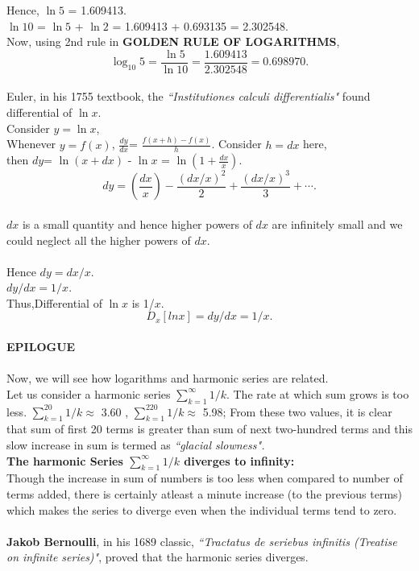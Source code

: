 \documentclass[a4paper,11pt]{article}
\begin{document}
Hence,  $\ln5$ = 1.609413.\\
$\ln10$ = $\ln 5$ + $\ln 2$ = 1.609413 + 0.693135 = 2.302548.\\
Now, using 2nd rule in \textbf{GOLDEN RULE OF LOGARITHMS},\\
$$ \log_{10}5 = \frac{\ln5}{\ln10} = \frac{1.609413}{2.302548} = 0.698970.$$ \\
Euler, in his 1755 textbook, the \textit{``Institutiones calculi differentialis"} found
 differential of $\ln x$. \\
Consider $y = \ln x$, \\
Whenever $y=f(x)$, $\frac{dy}{dx}$= $\frac{f(x+h)-f(x)}{h}$. Consider $h=dx$ here,\\
then $dy$= $\ln(x + dx)$ - $\ln x$ = $\ln( 1 + \frac{dx}{x})$.\\
$$ dy= \left(\frac{dx}{x}\right) - \frac{(dx/x)^2}{2} +  \frac{(dx/x)^3}{3} + \cdots. $$\\
$dx$ is a small quantity and hence higher powers of $dx$ are infinitely small and we could neglect all the higher powers of $dx$.\\
\\
Hence $dy = dx/x$.\\
$dy/dx = 1/x$.\\
Thus,Differential of $\ln x$ is 1/$x$.\\
$$D_{x}{[ln x]} = dy/dx = 1/x. $$
\\
\textbf{EPILOGUE}\\
\\
Now, we will see how logarithms and harmonic series are related.\\
Let us consider a harmonic series $\sum_{k=1}^{\infty}1/k$. The rate at which sum grows is too less. $\sum_{k=1}^{20}1/k \approx$ 3.60 , $\sum_{k=1}^{220}1/k \approx $ 5.98;
From these two values, it is clear that sum of first 20 terms is greater than sum of next two-hundred terms and this slow increase in sum is termed as 
\textit{``glacial slowness".}\\
\textbf{The harmonic Series $\sum_{k=1}^{\infty}1/k$ diverges to infinity:}\\
Though the increase in sum of numbers is too less when compared to number of terms added, there is certainly atleast a minute increase (to the previous terms) which makes the series to diverge even when the individual terms tend to zero.\\
\\
\textbf{Jakob Bernoulli},  in his 1689 classic, \textit{``Tractatus de 
seriebus infinitis (Treatise on infinite series)"},  proved that the harmonic series diverges.\\
\end{document}
